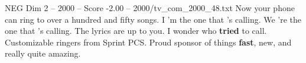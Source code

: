 \begin{textsample}{NEG Dim 2 – 2000 – Score -2.00 – 2000/tv\_com\_2000\_48.txt}  \label{ex:f2_neg_002}
Now your phone can ring to over a hundred and fifty songs.
I 'm the one that 's calling.
We 're the one that 's calling.
The lyrics are up to you.
I wonder who \textbf{tried} to call.
Customizable ringers from Sprint PCS.
Proud sponsor of things \textbf{fast}, new, and really quite amazing.

\end{textsample}
